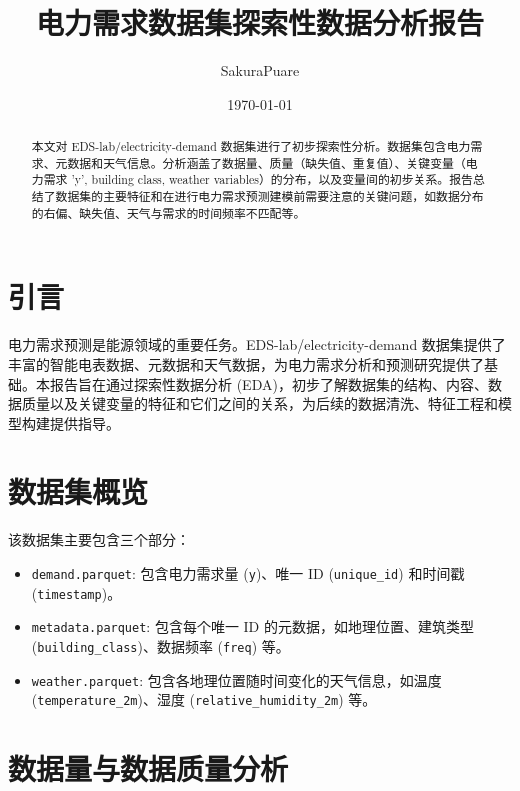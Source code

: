 \documentclass{article} %
\title{电力需求数据集探索性数据分析报告}
\author{SakuraPuare}
\date{\today} %
\begin{document}
\maketitle %

\begin{abstract}
本文对 EDS-lab/electricity-demand 数据集进行了初步探索性分析。数据集包含电力需求、元数据和天气信息。分析涵盖了数据量、质量（缺失值、重复值）、关键变量（电力需求 'y', building class, weather variables）的分布，以及变量间的初步关系。报告总结了数据集的主要特征和在进行电力需求预测建模前需要注意的关键问题，如数据分布的右偏、缺失值、天气与需求的时间频率不匹配等。
\end{abstract}

\newpage %

\section{引言}
\label{sec:introduction}

电力需求预测是能源领域的重要任务。EDS-lab/electricity-demand 数据集提供了丰富的智能电表数据、元数据和天气数据，为电力需求分析和预测研究提供了基础。本报告旨在通过探索性数据分析 (EDA)，初步了解数据集的结构、内容、数据质量以及关键变量的特征和它们之间的关系，为后续的数据清洗、特征工程和模型构建提供指导。

\section{数据集概览}
\label{sec:dataset_overview}

该数据集主要包含三个部分：
\begin{itemize}
    \item \texttt{demand.parquet}: 包含电力需求量 (\texttt{y})、唯一 ID (\texttt{unique\_id}) 和时间戳 (\texttt{timestamp})。
    \item \texttt{metadata.parquet}: 包含每个唯一 ID 的元数据，如地理位置、建筑类型 (\texttt{building\_class})、数据频率 (\texttt{freq}) 等。
    \item \texttt{weather.parquet}: 包含各地理位置随时间变化的天气信息，如温度 (\texttt{temperature\_2m})、湿度 (\texttt{relative\_humidity\_2m}) 等。
\end{itemize}

\section{数据量与数据质量分析}
\label{sec:data_quality}
\end{document}
